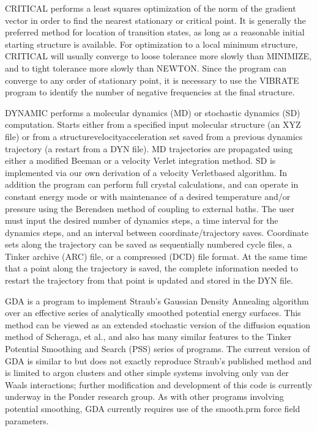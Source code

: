\documentclass[letterpaper,11pt,english]{sphinxmanual}
\begin{document}
\sphinxAtStartPar
{}

\sphinxAtStartPar
CRITICAL performs a least squares optimization of the norm of the gradient vector in order to find the nearest stationary or critical point. It is generally the preferred method for location of transition states, as long as a reasonable initial starting structure is available. For optimization to a local minimum structure, CRITICAL will usually converge to loose tolerance more slowly than MINIMIZE, and to tight tolerance more slowly than NEWTON. Since the program can converge to any order of stationary point, it is necessary to use the VIBRATE program to identify the number of negative frequencies at the final structure.

\sphinxAtStartPar
{}

\sphinxAtStartPar
DYNAMIC performs a molecular dynamics (MD) or stochastic dynamics (SD) computation. Starts either from a specified input molecular structure (an XYZ file) or from a structure\sphinxhyphen{}velocity\sphinxhyphen{}acceleration set saved from a previous dynamics trajectory (a restart from a DYN file). MD trajectories are propagated using either a modified Beeman or a velocity Verlet integration method. SD is implemented via our own derivation of a velocity Verlet\sphinxhyphen{}based algorithm. In addition the program can perform full crystal calculations, and can operate in constant energy mode or with maintenance of a desired temperature and/or pressure using the Berendsen method of coupling to external baths. The user must input the desired number of dynamics steps, a time interval for the dynamics steps, and an interval between coordinate/trajectory saves. Coordinate sets along the trajectory can be saved as sequentially numbered cycle files, a Tinker archive (ARC) file, or a compressed (DCD) file format. At the same time that a point along the trajectory is saved, the complete information needed to restart the trajectory from that point is updated and stored in the DYN file.

\sphinxAtStartPar
{}

\sphinxAtStartPar
GDA is a program to implement Straub’s Gaussian Density Annealing algorithm over an effective series of analytically smoothed potential energy surfaces. This method can be viewed as an extended stochastic version of the diffusion equation method of Scheraga, et al., and also has many similar features to the Tinker Potential Smoothing and Search (PSS) series of programs. The current version of GDA is similar to but does not exactly reproduce Straub’s published method and is limited to argon clusters and other simple systems involving only van der Waals interactions; further modification and development of this code is currently underway in the Ponder research group. As with other programs involving potential smoothing, GDA currently requires use of the smooth.prm force field parameters.
\end{document}
